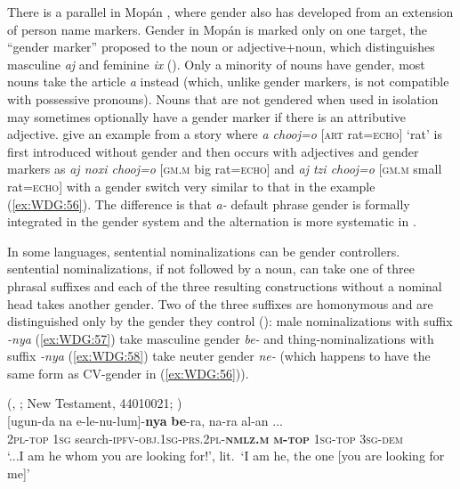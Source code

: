 \documentclass[output=collectionpaper]{langsci/langscibook}
\begin{document}
There is a parallel in Mopán , where gender also has developed from an extension of person name markers. Gender in Mopán  is marked only on one target, the ``gender marker'' proposed to the noun or adjective+noun, which distinguishes masculine \textit{aj} and feminine \textit{ix} (\citealt{Contini-Morava2018}). Only a minority of nouns have gender, most nouns take the article \textit{a} instead (which, unlike gender markers, is not compatible with possessive pronouns). Nouns that are not gendered when used in isolation may sometimes optionally have a gender marker if there is an attributive adjective. \cite[138]{Contini-Morava2018} give an example from a story where \textit{a ch\textquotesingle{}o\textquotesingle{}oj=o} [\textsc{art} rat=\textsc{echo}] `rat' is first introduced without gender and then occurs with adjectives and gender markers as \textit{aj noxi\textquotesingle{}  ch\textquotesingle{}o\textquotesingle{}oj=o} [\textsc{gm.m} big rat=\textsc{echo}] and \textit{aj tz\textquotesingle{}i\textquotesingle{} ch\textquotesingle{}o\textquotesingle{}oj=o} [\textsc{gm.m} small rat=\textsc{echo}] with a gender switch very similar to that in the  example (\ref{ex:WDG:56}). The difference is that  \textit{a-} default phrase gender is formally integrated in the gender system and the alternation is more systematic in .

In some languages, sentential nominalizations can be gender controllers.  sentential nominalizations, if not followed by a noun, can take one of three phrasal suffixes and each of the three resulting constructions without a nominal head takes another gender. Two of the three suffixes are homonymous and are distinguished only by the gender they control (\citealt{Waelchli2018}): male nominalizations with suffix \textit{-nya} (\ref{ex:WDG:57}) take masculine gender \textit{be-} and thing-nominalizations with suffix \textit{-nya} (\ref{ex:WDG:58}) take neuter gender \textit{ne-} (which happens to have the same form as CV-gender in (\ref{ex:WDG:56})).

\ea\label{ex:WDG:57}
 (, ; New Testament, 44010021; \citealt[80]{Waelchli2018})\\
 [ugun-da	na	e-le-nu-lum]-\textbf{nya}	\textbf{be}-ra,	na-ra	al-an ...\\
{} \textsc{2pl-top}	\textsc{1sg}\footnotemark{} 	search-\textsc{ipfv-obj.1sg-prs.2pl-\textbf{nmlz.m}}	\textbf{\textsc{m-top}}	\textsc{1sg-top}	\textsc{3sg-dem} {}\\
\glt `...I am he whom you are looking for!', lit.\ `I am he, the one [you are looking for me]'\\
\z
%
\end{document}
